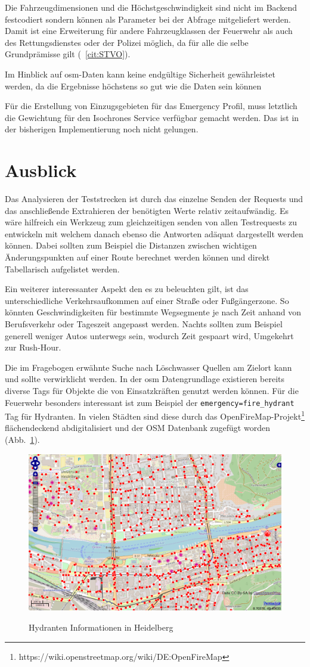 Die Fahrzeugdimensionen und die Höchstgeschwindigkeit sind nicht im Backend festcodiert sondern können als Parameter bei der Abfrage mitgeliefert werden.
Damit ist eine Erweiterung für andere Fahrzeugklassen der Feuerwehr als auch des Rettungsdienstes oder der Polizei möglich, da für alle die selbe Grundprämisse gilt (~\ref{cit:STVO}).

Im Hinblick auf \gls{osm}-Daten kann keine endgültige Sicherheit gewährleistet werden, da die Ergebnisse höchstens so gut wie die Daten sein können

Für die Erstellung von Einzugsgebieten für das Emergency Profil, muss letztlich die Gewichtung für den Isochrones Service verfügbar gemacht werden.
Das ist in der bisherigen Implementierung noch nicht gelungen.

\newpage
\section{Ausblick}


Das Analysieren der Teststrecken ist durch das einzelne Senden der Requests und das anschließende Extrahieren der benötigten Werte relativ zeitaufwändig.
Es wäre hilfreich ein Werkzeug zum gleichzeitigen senden von allen Testrequests zu entwickeln mit welchem danach ebenso die Antworten adäquat dargestellt werden können.
Dabei sollten zum Beispiel die Distanzen zwischen wichtigen Änderungspunkten auf einer Route berechnet werden können und direkt Tabellarisch aufgelistet werden.

Ein weiterer interessanter Aspekt den es zu beleuchten gilt, ist das unterschiedliche Verkehrsaufkommen auf einer Straße oder Fußgängerzone.
So könnten Geschwindigkeiten für bestimmte Wegsegmente je nach Zeit anhand von Berufsverkehr oder Tageszeit angepasst werden.
Nachts sollten zum Beispiel generell weniger Autos unterwegs sein, wodurch Zeit gespaart wird, Umgekehrt zur Rush-Hour.

Die im Fragebogen erwähnte Suche nach Löschwasser Quellen am Zielort kann und sollte verwirklicht werden.
In der \gls{osm} Datengrundlage existieren bereits diverse Tags für Objekte die von Einsatzkräften genutzt werden können.
Für die Feuerwehr besonders interessant ist zum Beispiel der \texttt{emergency=fire\_hydrant} Tag für Hydranten.
In vielen Städten sind diese durch das OpenFireMap-Projekt\footnote{https://wiki.openstreetmap.org/wiki/DE:OpenFireMap} flächendeckend abdigitalisiert und der OSM Datenbank zugefügt worden (Abb.~\ref{fig:firehydrants}).

\begin{figure}[h]
\centering
\caption{Hydranten Informationen in Heidelberg}
\label{fig:firehydrants}
\includegraphics[width = 0.80 \textwidth]{../media/firehydrants.png} \\
\end{figure}